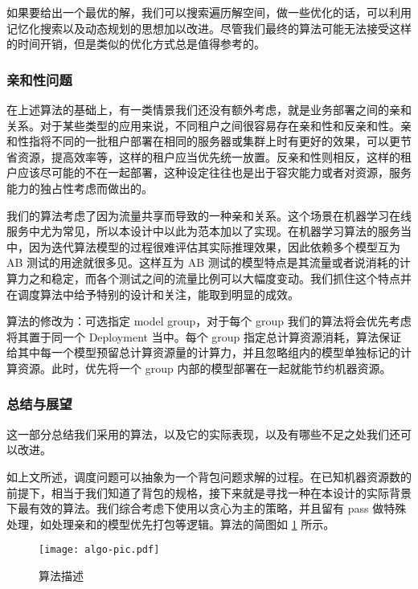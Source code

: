 如果要给出一个最优的解，我们可以搜索遍历解空间，做一些优化的话，可以利用记忆化搜索以及动态规划的思想加以改进。尽管我们最终的算法可能无法接受这样的时间开销，但是类似的优化方式总是值得参考的。

\subsubsection{亲和性问题}

在上述算法的基础上，有一类情景我们还没有额外考虑，就是业务部署之间的亲和关系。对于某些类型的应用来说，不同租户之间很容易存在亲和性和反亲和性。亲和性指将不同的一批租户部署在相同的服务器或集群上时有更好的效果，可以更节省资源，提高效率等，这样的租户应当优先统一放置。反亲和性则相反，这样的租户应该尽可能的不在一起部署，这种设定往往也是出于容灾能力或者对资源，服务能力的独占性考虑而做出的。

我们的算法考虑了因为流量共享而导致的一种亲和关系。这个场景在机器学习在线服务中尤为常见，所以本设计中以此为范本加以了实现。在机器学习算法的服务当中，因为迭代算法模型的过程很难评估其实际推理效果，因此依赖多个模型互为 AB 测试的用途就很多见。这样互为 AB 测试的模型特点是其流量或者说消耗的计算力之和稳定，而各个测试之间的流量比例可以大幅度变动。我们抓住这个特点并在调度算法中给予特别的设计和关注，能取到明显的成效。

算法的修改为：可选指定 model group，对于每个 group 我们的算法将会优先考虑将其置于同一个 Deployment 当中。每个 group 指定总计算资源消耗，算法保证给其中每一个模型预留总计算资源量的计算力，并且忽略组内的模型单独标记的计算资源。此时，优先将一个 group 内部的模型部署在一起就能节约机器资源。

\subsubsection{总结与展望}

这一部分总结我们采用的算法，以及它的实际表现，以及有哪些不足之处我们还可以改进。


如上文所述，调度问题可以抽象为一个背包问题求解的过程。在已知机器资源数的前提下，相当于我们知道了背包的规格，接下来就是寻找一种在本设计的实际背景下最有效的算法。我们综合考虑下使用以贪心为主的策略，并且留有 pass 做特殊处理，如处理亲和的模型优先打包等逻辑。算法的简图如 \ref{fig:algo} 所示。

\begin{figure}

\centering

\texttt{[image: algo-pic.pdf]}

\caption{算法描述}\label{fig:algo}

\end{figure}

